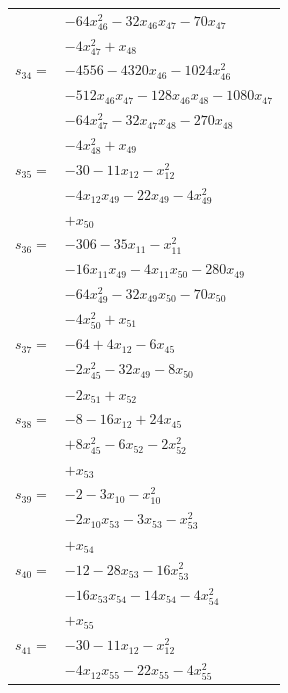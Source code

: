 \begin{longtable}{@{}r@{\;}l@{}}
 & \(\displaystyle -64x_{46}^{2} -32x_{46}x_{47} -70x_{47}\) \\
 & \(\displaystyle -4x_{47}^{2} +x_{48}\) \\[3pt]
\(s_{34}=\) & \(\displaystyle -4556 -4320x_{46} -1024x_{46}^{2}\) \\
 & \(\displaystyle -512x_{46}x_{47} -128x_{46}x_{48} -1080x_{47}\) \\
 & \(\displaystyle -64x_{47}^{2} -32x_{47}x_{48} -270x_{48}\) \\
 & \(\displaystyle -4x_{48}^{2} +x_{49}\) \\[3pt]
\(s_{35}=\) & \(\displaystyle -30 -11x_{12} -x_{12}^{2}\) \\
 & \(\displaystyle -4x_{12}x_{49} -22x_{49} -4x_{49}^{2}\) \\
 & \(\displaystyle +x_{50}\) \\[3pt]
\(s_{36}=\) & \(\displaystyle -306 -35x_{11} -x_{11}^{2}\) \\
 & \(\displaystyle -16x_{11}x_{49} -4x_{11}x_{50} -280x_{49}\) \\
 & \(\displaystyle -64x_{49}^{2} -32x_{49}x_{50} -70x_{50}\) \\
 & \(\displaystyle -4x_{50}^{2} +x_{51}\) \\[3pt]
\(s_{37}=\) & \(\displaystyle -64 +4x_{12} -6x_{45}\) \\
 & \(\displaystyle -2x_{45}^{2} -32x_{49} -8x_{50}\) \\
 & \(\displaystyle -2x_{51} +x_{52}\) \\[3pt]
\(s_{38}=\) & \(\displaystyle -8 -16x_{12} +24x_{45}\) \\
 & \(\displaystyle +8x_{45}^{2} -6x_{52} -2x_{52}^{2}\) \\
 & \(\displaystyle +x_{53}\) \\[3pt]
\(s_{39}=\) & \(\displaystyle -2 -3x_{10} -x_{10}^{2}\) \\
 & \(\displaystyle -2x_{10}x_{53} -3x_{53} -x_{53}^{2}\) \\
 & \(\displaystyle +x_{54}\) \\[3pt]
\(s_{40}=\) & \(\displaystyle -12 -28x_{53} -16x_{53}^{2}\) \\
 & \(\displaystyle -16x_{53}x_{54} -14x_{54} -4x_{54}^{2}\) \\
 & \(\displaystyle +x_{55}\) \\[3pt]
\(s_{41}=\) & \(\displaystyle -30 -11x_{12} -x_{12}^{2}\) \\
 & \(\displaystyle -4x_{12}x_{55} -22x_{55} -4x_{55}^{2}\) \\

\end{longtable}
